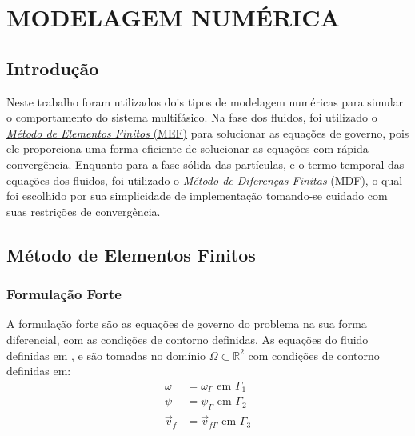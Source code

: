 \chapter{\textbf{MODELAGEM NUMÉRICA}}
\label{sec_modelagem}

\section{\textbf{Introdução}}
Neste trabalho foram utilizados dois tipos de modelagem numéricas para simular o comportamento do sistema multifásico.
Na fase dos fluidos, foi utilizado o \hyperref[mef]{\textit{Método de Elementos Finitos} (MEF)} para solucionar as equações de governo, pois ele proporciona uma forma eficiente de solucionar as equações com rápida convergência.
Enquanto para a fase sólida das partículas, e o termo temporal das equações dos fluidos, foi utilizado o \hyperref[mdf]{\textit{Método de Diferenças Finitas} (MDF)}, o qual foi escolhido por sua simplicidade de implementação tomando-se cuidado com suas restrições de convergência.


\section{\textbf{Método de Elementos Finitos}}
\label{mef}
\subsection{\textbf{Formulação Forte}}
\label{form_forte}
A formulação forte são as equações de governo do problema na sua forma diferencial, com as condições de contorno definidas.
As equações do fluido definidas em ,  e  são tomadas no domínio $\Omega \subset \mathbb{R}^2$ com condições de contorno definidas em:
\begin{align}
    \omega &= \omega_{\Gamma} \text{ em } \Gamma_1 \\
    \psi &= \psi_{\Gamma} \text{ em } \Gamma_2 \\
    \vec{v}_f &= \vec{v}_{f\Gamma} \text{ em } \Gamma_3 
\end{align}

